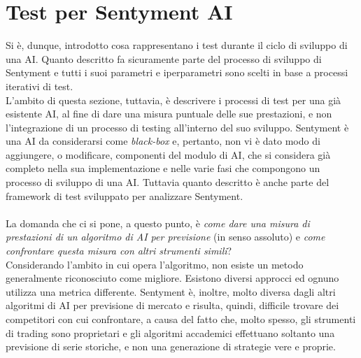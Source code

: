 \documentclass[a4paper,12pt]{report}
\begin{document}
\section{Test per Sentyment AI}
Si è, dunque, introdotto cosa rappresentano i test durante il ciclo di sviluppo di una AI. Quanto descritto fa sicuramente parte del processo di sviluppo di Sentyment e tutti i suoi parametri e iperparametri sono scelti in base a processi iterativi di test.\\ L'ambito di questa sezione, tuttavia, è descrivere i processi di test per una già esistente AI, al fine di dare una misura puntuale delle sue prestazioni, e non l'integrazione di un processo di testing all'interno del suo sviluppo. Sentyment è una AI da considerarsi come \textit{black-box} e, pertanto, non vi è dato modo di aggiungere, o modificare, componenti del modulo di AI, che si considera già completo nella sua implementazione e nelle varie fasi che compongono un processo di sviluppo di una AI. Tuttavia quanto descritto è anche parte del framework di test sviluppato per analizzare Sentyment.\\~\\ La domanda che ci si pone, a questo punto, è \textit{come dare una misura di prestazioni di un algoritmo di AI per previsione} (in senso assoluto) e \textit{come confrontare questa misura con altri strumenti simili}?\\ Considerando l'ambito in cui opera l'algoritmo, non esiste un metodo generalmente riconosciuto come migliore. Esistono diversi approcci ed ognuno utilizza una metrica differente. Sentyment è, inoltre, molto diversa dagli altri algoritmi di AI per previsione di mercato e risulta, quindi, difficile trovare dei competitori con cui confrontare, a causa del fatto che, molto spesso, gli strumenti di trading sono proprietari e gli algoritmi accademici effettuano soltanto una previsione di serie storiche, e non una generazione di strategie vere e proprie.\\~\\
\end{document}
